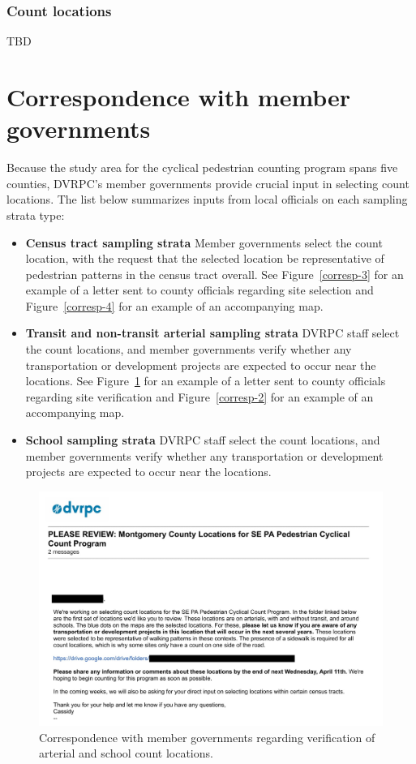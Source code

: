 \documentclass[paper=letterpaper, fontsize=11pt]{scrartcl}
\begin{document}
\subsubsection{Count locations}

TBD

\section{Correspondence with member governments}
\label{sec:stakeholder-engagement}
Because the study area for the cyclical pedestrian counting program spans five counties, DVRPC's member governments provide crucial input in selecting count locations. The list below summarizes inputs from local officials on each sampling strata type:

\begin{itemize}
	\item \textbf{Census tract sampling strata} Member governments select the count location, with the request that the selected location be representative of pedestrian patterns in the census tract overall. See Figure~\ref{corresp-3} for an example of a letter sent to county officials regarding site selection and Figure~\ref{corresp-4} for an example of an accompanying map.
	\item \textbf{Transit and non-transit arterial sampling strata} DVRPC staff select the count locations, and member governments verify whether any transportation or development projects are expected to occur near the locations. See Figure~\ref{corresp-1} for an example of a letter sent to county officials regarding site verification and Figure~\ref{corresp-2} for an example of an accompanying map.
	\item \textbf{School sampling strata} DVRPC staff select the count locations, and member governments verify whether any transportation or development projects are expected to occur near the locations.
\end{itemize}

\FloatBarrier
\begin{figure}[!htbp]
	\centering
	\includegraphics[width=\textwidth]{county-corresp-1.jpg}
	\caption{Correspondence with member governments regarding verification of arterial and school count locations.}
	\label{corresp-1}
\end{figure}
\FloatBarrier
\end{document}

